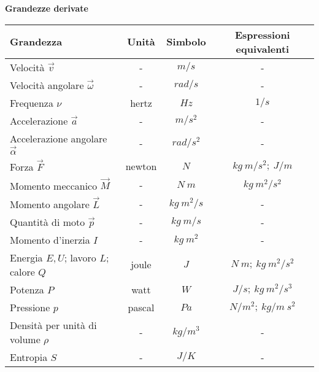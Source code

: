 \begin{center}
	\textbf{Grandezze derivate}
\end{center}

\begin{table}[!h]
	\centering
	\begin{tabular}{l|c|c|c}
		\hline
		\textbf{Grandezza} & \textbf{Unità} & \textbf{Simbolo} & \textbf{Espressioni equivalenti} \\
		\hline
		Velocità $\displaystyle \vec{v}$ & - & $\displaystyle m/s$ & - \\
		Velocità angolare $\displaystyle \vec{\omega }$ & - & $\displaystyle rad/s$ & - \\
		Frequenza $\displaystyle \nu $ & hertz & $\displaystyle Hz$ & $\displaystyle 1/s$ \\
		Accelerazione $\displaystyle \vec{a}$ & - & $\displaystyle m/s^2$ & - \\
		Accelerazione angolare $\displaystyle \vec{\alpha }$ & - & $\displaystyle rad/s^2$ & - \\
		Forza $\displaystyle \vec{F}$ & newton & $\displaystyle N$ & $\displaystyle kg\ m/s^2 ;\ J/m$ \\
		Momento meccanico $\displaystyle \vec{M}$ & - & $\displaystyle N\ m$ & $\displaystyle kg\ m^2 /s^2$ \\
		Momento angolare $\displaystyle \vec{L}$ & - & $\displaystyle kg\ m^2 /s$ & - \\
		Quantità di moto $\displaystyle \vec{p}$ & - & $\displaystyle kg\ m /s$ & - \\
		Momento d'inerzia $\displaystyle I$ & - & $\displaystyle kg\ m^2$ & - \\
		Energia $\displaystyle E,U$; lavoro $\displaystyle L$; calore $\displaystyle Q$ & joule & $\displaystyle J$ & $\displaystyle N\ m;\ kg\ m^2 /s^2$ \\
		Potenza $\displaystyle P$ & watt & $\displaystyle W$ & $\displaystyle J/s;\ kg\ m^2 /s^3$ \\
		Pressione $\displaystyle p$ & pascal & $\displaystyle Pa$ & $\displaystyle N/m^2 ;\ kg/m\ s^2$ \\
		Densità per unità di volume $\displaystyle \rho $ & - & $\displaystyle kg/m^3$ & - \\
		Entropia $\displaystyle S$ & - & $\displaystyle J/K$ & - \\
	\end{tabular}
\end{table}

\newpage

